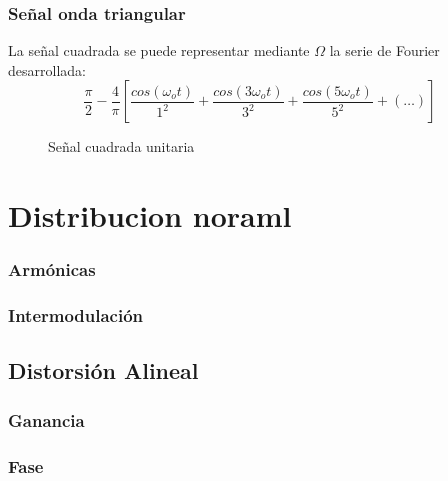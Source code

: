\documentclass{article}
\begin{document}
\subsubsection{Señal onda triangular}

La señal cuadrada se puede representar mediante $\Omega$ la serie de Fourier desarrollada:\citep{SeriesFourier}\\

\begin{equation}
    \frac{\pi}{2} - \frac{4}{\pi}[\frac{cos(\omega_o t)}{1^2}+\frac{cos(3\omega_o t)}{3^2}+\frac{cos(5\omega_o t)}{5^2}+(\ldots)]
\end{equation}

\begin{figure}[h!]
    \centering

\caption{Señal cuadrada unitaria}
\label{SenalTriangular20pp}
\end{figure}



\section{Distribucion noraml}




\subsubsection{Armónicas}

\subsubsection{Intermodulación}

\subsection{Distorsión Alineal}

\subsubsection{Ganancia}

\subsubsection{Fase}





\end{document}
